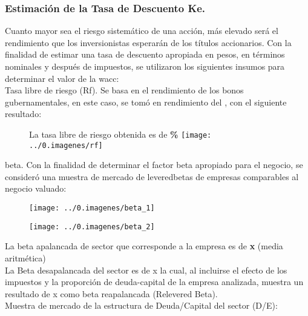 \subsubsection{Estimaci\'on de la Tasa de Descuento Ke.}

Cuanto mayor sea el riesgo sistem\'atico de una acci\'on, m\'as elevado ser\'a el rendimiento que los inversionistas esperar\'an de los t\'itulos accionarios. Con la finalidad de estimar una tasa de descuento apropiada en pesos, en t\'erminos nominales y despu\'es de impuestos, se utilizaron los siguientes insumos para determinar el valor de la \gls{wacc}:\\


\textcolor{principal}{Tasa libre de riesgo (Rf).} Se basa en el rendimiento de los bonos gubernamentales, en este caso, se tom\'o en rendimiento del \textcolor{principal}{\rfBase}, con el siguiente resultado:

\begin{figure}[H]
\centering
La tasa libre de riesgo obtenida es de \textbf{\rfValor\%} \texttt{[image: ../0.imagenes/rf]}
\end{figure}

\gls{beta}. Con la finalidad de determinar el factor \gls{beta} apropiado para el negocio, se consider\'o una muestra de mercado de \glspl{leveredbeta} de empresas comparables al negocio valuado:

\espacio{4cm}
\begin{figure}[H]
\centering
\texttt{[image: ../0.imagenes/beta\_1]}\\
\end{figure}


\begin{figure}[H]
\centering
\texttt{[image: ../0.imagenes/beta\_2]}
\end{figure}

La beta apalancada de sector que corresponde a la empresa es de \textcolor{principal}{\textbf{\valorBeta x }(media aritmética)}\\

La Beta desapalancada del sector es de \textcolor{principal}{\betaDesapalancada x} la cual, al incluirse el efecto de los impuestos y la proporción de deuda-capital de la empresa analizada, muestra un resultado de \textcolor{principal}{\betaReapalancada x} como beta reapalancada ({\textitt Relevered Beta}).\\


\textcolor{principal}{Muestra de mercado de la estructura de Deuda/Capital del sector (D/E):}

